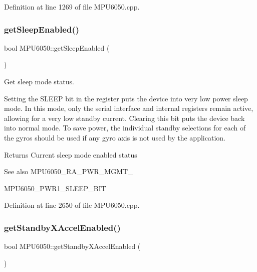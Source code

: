 Definition at line 1269 of file M\+P\+U6050.\+cpp.

\mbox{\label{classMPU6050_a196404ef04b959083d4bf5e6f1cd8b98}} 
\subsubsection{\texorpdfstring{getSleepEnabled()}{getSleepEnabled()}}
{\footnotesize\ttfamily bool M\+P\+U6050\+::get\+Sleep\+Enabled (\begin{DoxyParamCaption}{ }\end{DoxyParamCaption})}



Get sleep mode status. 

Setting the S\+L\+E\+EP bit in the register puts the device into very low power sleep mode. In this mode, only the serial interface and internal registers remain active, allowing for a very low standby current. Clearing this bit puts the device back into normal mode. To save power, the individual standby selections for each of the gyros should be used if any gyro axis is not used by the application. \begin{DoxyReturn}{Returns}
Current sleep mode enabled status 
\end{DoxyReturn}
\begin{DoxySeeAlso}{See also}
M\+P\+U6050\+\_\+\+R\+A\+\_\+\+P\+W\+R\+\_\+\+M\+G\+M\+T\+\_ 

M\+P\+U6050\+\_\+\+P\+W\+R1\+\_\+\+S\+L\+E\+E\+P\+\_\+\+B\+IT 
\end{DoxySeeAlso}


Definition at line 2650 of file M\+P\+U6050.\+cpp.

\mbox{\label{classMPU6050_a99261a04739fdb7a9a1c5b67ce3e710e}} 
\subsubsection{\texorpdfstring{getStandbyXAccelEnabled()}{getStandbyXAccelEnabled()}}
{\footnotesize\ttfamily bool M\+P\+U6050\+::get\+Standby\+X\+Accel\+Enabled (\begin{DoxyParamCaption}{ }\end{DoxyParamCaption})}



